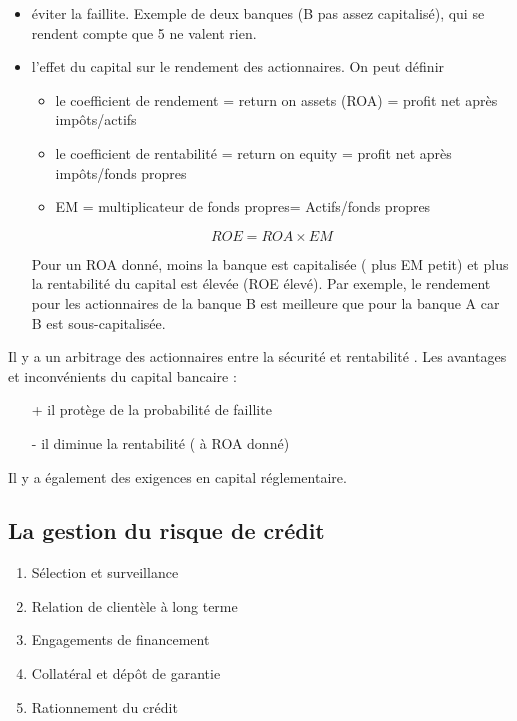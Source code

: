 	\begin{itemize}
	
		\item éviter la faillite. Exemple de deux banques (B pas assez capitalisé), qui se rendent compte que 5 ne valent rien.
		

		\item l'effet du capital sur le rendement des actionnaires. On peut définir
		
		\begin{itemize}
			\item le coefficient de rendement = return on assets (ROA) = profit net après impôts/actifs 
			\item le coefficient de rentabilité = return on equity = profit net après impôts/fonds 
propres 
			\item EM = multiplicateur de fonds propres= Actifs/fonds propres 
		\end{itemize}
		
		$$ROE = ROA \times EM $$
		
		Pour un ROA donné, moins la banque est capitalisée ( plus EM petit) et plus la rentabilité du capital est élevée (ROE élevé). Par exemple, le rendement pour les actionnaires de la banque B est meilleure que pour la banque A car B est sous-capitalisée.
	\end{itemize}
	
	Il y a un arbitrage des actionnaires entre la sécurité et rentabilité . Les avantages et inconvénients du capital bancaire :
	\begin{itemize}
		\item[+] il protège de la probabilité de faillite 
		\item[-] il diminue la rentabilité ( à ROA donné) 
	\end{itemize}
		
	 Il y a également des exigences en capital réglementaire.
	
	
	\subsection{La gestion du risque de crédit}
	
	\begin{enumerate}	
		\item Sélection et surveillance 
		\item Relation de clientèle à long terme 
		\item Engagements de financement 
		\item Collatéral et dépôt de garantie 
		\item Rationnement du crédit
	\end{enumerate}
	

